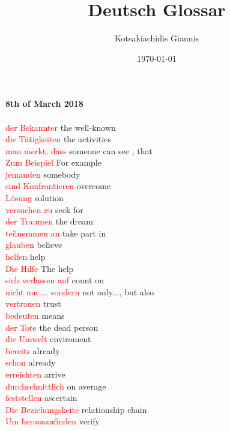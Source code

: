 \documentclass{article}
\title{\textbf{Deutsch Glossar}}
\author{Kotsakiachidis Giannis }
\date{\today }
\begin{document}
	\maketitle
	
	\clearpage
	
	\begin{multicols}{2}
	
	\textbf{8th of March 2018}\\\\
	\textcolor{red}{der Bekannter} the well-known\\
	\textcolor{red}{die Tätigkeiten} the activities\\
	\textcolor{red}{man merkt, dass} someone can see , that\\
	\textcolor{red}{Zum Beispiel} For example\\
	\textcolor{red}{jemanden} somebody\\
	\textcolor{red}{sind Konfrontieren} overcome\\
	\textcolor{red}{Lösung} solution\\
	\textcolor{red}{versuchen zu} seek for\\
	\textcolor{red}{der Traumen} the dream\\
	\textcolor{red}{teilnemmen an} take part in\\
	\textcolor{red}{glauben} believe\\
	\textcolor{red}{helfen} help\\
	\textcolor{red}{Die Hilfe} The help\\
	\textcolor{red}{sich verlassen auf} count on\\
	\textcolor{red}{nicht nur..., sondern} not only..., but also\\
	\textcolor{red}{vertrauen} trust\\
	\textcolor{red}{bedeuten} means\\
	\textcolor{red}{der Tote} the dead person\\
	\textcolor{red}{die Umwelt} enviroment\\
	\textcolor{red}{bereits} already\\
	\textcolor{red}{schon} already\\
	\textcolor{red}{erreichten} arrive\\
	\textcolor{red}{durchschnittlich} on average\\
	\textcolor{red}{feststellen} ascertain\\
	\textcolor{red}{Die Beziehungskeite} relationship chain\\
	\textcolor{red}{Um herauszufinden} verify\\

\end{multicols}
\end{document}
